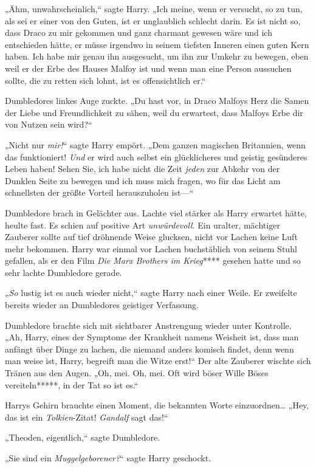 {„Ähm, unwahrscheinlich,“ sagte Harry. „Ich meine, wenn er versucht, so zu tun, als sei er einer von den Guten, ist er unglaublich schlecht darin. Es ist nicht so, dass Draco zu mir gekommen und ganz charmant gewesen wäre und ich entschieden hätte, er müsse irgendwo in seinem tiefsten Inneren einen guten Kern haben. Ich habe mir genau ihn ausgesucht, um ihn zur Umkehr zu bewegen, eben weil er der Erbe des Hauses Malfoy ist und wenn man eine Person aussuchen sollte, die zu retten sich lohnt, ist es offensichtlich er.“

Dumbledores linkes Auge zuckte. „Du hast vor, in Draco Malfoys Herz die Samen der Liebe und Freundlichkeit zu sähen, weil du erwartest, dass Malfoys Erbe dir von Nutzen sein wird?“

„Nicht nur \emph{mir!}“ sagte Harry empört. „Dem ganzen magischen Britannien, wenn das funktioniert! \emph{Und} er wird auch selbst ein glücklicheres und geistig gesünderes Leben haben! Sehen Sie, ich habe nicht die Zeit \emph{jeden} zur Abkehr von der Dunklen Seite zu bewegen und ich muss mich fragen, wo für das Licht am schnellsten der größte Vorteil herauszuholen ist—“

Dumbledore brach in Gelächter aus. Lachte viel stärker als Harry erwartet hätte, heulte fast. Es schien auf positive Art \emph{unwürdevoll}. Ein uralter, mächtiger Zauberer sollte auf tief dröhnende Weise glucksen, nicht vor Lachen keine Luft mehr bekommen. Harry war einmal vor Lachen buchstäblich von seinem Stuhl gefallen, als er den Film \emph{Die Marx Brothers im Krieg}**** gesehen hatte und so sehr lachte Dumbledore gerade.

„\emph{So} lustig ist es auch wieder nicht,“ sagte Harry nach einer Weile. Er zweifelte bereits wieder an Dumbledores geistiger Verfassung.

Dumbledore brachte sich mit sichtbarer Anstrengung wieder unter Kontrolle. „Ah, Harry, eines der Symptome der Krankheit namens Weisheit ist, dass man anfängt über Dinge zu lachen, die niemand anders komisch findet, denn wenn man weise ist, Harry, begreift man die Witze erst!“ Der alte Zauberer wischte sich Tränen aus den Augen. „Oh, mei. Oh, mei. Oft wird böser Wille Böses vereiteln*****, in der Tat so ist es.“

Harrys Gehirn brauchte einen Moment, die bekannten Worte einzuordnen… „Hey, das ist ein \emph{Tolkien}-Zitat! \emph{Gandalf} sagt das!“

„Theoden, eigentlich,“ sagte Dumbledore.

„Sie sind ein \emph{Muggelgeborener?}“ sagte Harry geschockt.

}
